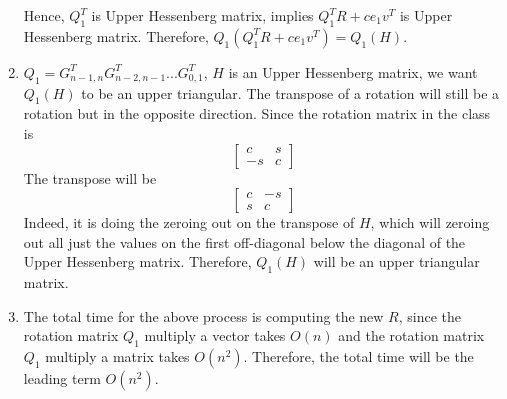 \documentclass[11pt]{article}
\begin{document}
\begin{solution}
\begin{enumerate}
    Hence, $Q_1^T$ is Upper Hessenberg matrix, implies $Q_1^TR + ce_1v^T$ is Upper Hessenberg matrix. Therefore, $Q_1(Q_1^TR + ce_1v^T) = Q_1(H)$. 
    \item $Q_1 = G_{n-1,n}^TG_{n-2,n-1}^T...G_{0,1}^T$, $H$ is an Upper Hessenberg matrix, we want $Q_1(H)$ to be an upper triangular. The transpose of a rotation will still be a rotation but in the opposite direction. Since the rotation matrix in the class is \\
    \[
      \begin{bmatrix}
        c & s\\
        -s & c
      \end{bmatrix}
    \]
    The transpose will be 
    \[
      \begin{bmatrix}
        c & -s\\
        s & c
      \end{bmatrix}
    \]
    Indeed, it is doing the zeroing out on the transpose of $H$, which will zeroing out all just the values on the first off-diagonal below the diagonal of the Upper Hessenberg matrix. Therefore, $Q_1(H)$ will be an upper triangular matrix.
    \item The total time for the above process is computing the new $R$, since the rotation matrix $Q_1$ multiply a vector takes $O(n)$ and  the rotation matrix $Q_1$ multiply a matrix takes $O(n^2)$. Therefore, the total time will be the leading term $O(n^2)$.
    \end{enumerate}
\end{solution}
\end{document}
